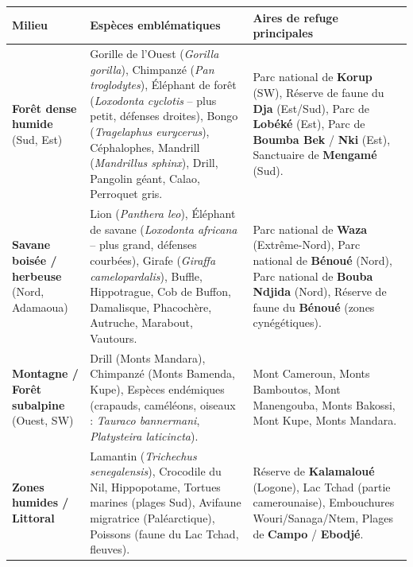 \documentclass[11pt]{article}
\begin{document}
\begin{exemplebox}
\begin{center}
\begin{tabularx}{\linewidth}{|l|X|X|}\hline
\rowcolor{popblueL}
\textbf{Milieu} & \textbf{Espèces emblématiques} & \textbf{Aires de refuge principales} \\ \hline
\textbf{Forêt dense humide} (Sud, Est) & Gorille de l'Ouest (\emph{Gorilla gorilla}), Chimpanzé (\emph{Pan troglodytes}), Éléphant de forêt (\emph{Loxodonta cyclotis} -- plus petit, défenses droites), Bongo (\emph{Tragelaphus eurycerus}), Céphalophes, Mandrill (\emph{Mandrillus sphinx}), Drill, Pangolin géant, Calao, Perroquet gris. & Parc national de \textbf{Korup} (SW), Réserve de faune du \textbf{Dja} (Est/Sud), Parc de \textbf{Lobéké} (Est), Parc de \textbf{Boumba Bek} / \textbf{Nki} (Est), Sanctuaire de \textbf{Mengamé} (Sud). \\ \hline
\textbf{Savane boisée / herbeuse} (Nord, Adamaoua) & Lion (\emph{Panthera leo}), Éléphant de savane (\emph{Loxodonta africana} -- plus grand, défenses courbées), Girafe (\emph{Giraffa camelopardalis}), Buffle, Hippotrague, Cob de Buffon, Damalisque, Phacochère, Autruche, Marabout, Vautours. & Parc national de \textbf{Waza} (Extrême-Nord), Parc national de \textbf{Bénoué} (Nord), Parc national de \textbf{Bouba Ndjida} (Nord), Réserve de faune du \textbf{Bénoué} (zones cynégétiques). \\ \hline
\textbf{Montagne / Forêt subalpine} (Ouest, SW) & Drill (Monts Mandara), Chimpanzé (Monts Bamenda, Kupe), Espèces endémiques (crapauds, caméléons, oiseaux : \emph{Tauraco bannermani}, \emph{Platysteira laticincta}). & Mont Cameroun, Monts Bamboutos, Mont Manengouba, Monts Bakossi, Mont Kupe, Monts Mandara. \\ \hline
\textbf{Zones humides / Littoral} & Lamantin (\emph{Trichechus senegalensis}), Crocodile du Nil, Hippopotame, Tortues marines (plages Sud), Avifaune migratrice (Paléarctique), Poissons (faune du Lac Tchad, fleuves). & Réserve de \textbf{Kalamaloué} (Logone), Lac Tchad (partie camerounaise), Embouchures Wouri/Sanaga/Ntem, Plages de \textbf{Campo} / \textbf{Ebodjé}. \\ \hline
\end{tabularx}
\end{center}
\end{exemplebox}
\end{document}

